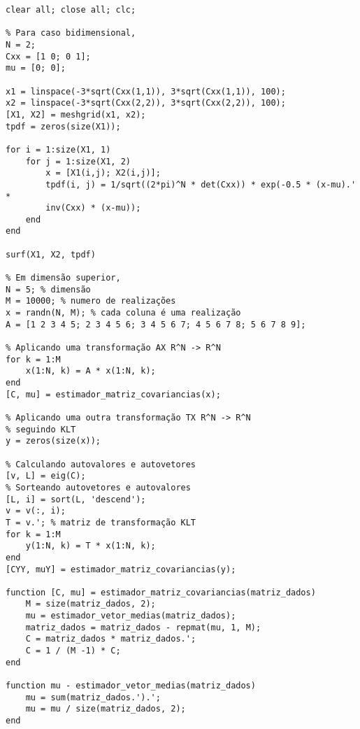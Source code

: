 \documentclass{article}
\begin{document}
\begin{verbatim}
clear all; close all; clc;

% Para caso bidimensional,
N = 2;
Cxx = [1 0; 0 1];
mu = [0; 0];

x1 = linspace(-3*sqrt(Cxx(1,1)), 3*sqrt(Cxx(1,1)), 100);
x2 = linspace(-3*sqrt(Cxx(2,2)), 3*sqrt(Cxx(2,2)), 100);
[X1, X2] = meshgrid(x1, x2);
tpdf = zeros(size(X1));

for i = 1:size(X1, 1)
    for j = 1:size(X1, 2)
        x = [X1(i,j); X2(i,j)];
        tpdf(i, j) = 1/sqrt((2*pi)^N * det(Cxx)) * exp(-0.5 * (x-mu).' *
        inv(Cxx) * (x-mu));
    end
end

surf(X1, X2, tpdf)

% Em dimensão superior,
N = 5; % dimensão
M = 10000; % numero de realizações
x = randn(N, M); % cada coluna é uma realização
A = [1 2 3 4 5; 2 3 4 5 6; 3 4 5 6 7; 4 5 6 7 8; 5 6 7 8 9];

% Aplicando uma transformação AX R^N -> R^N
for k = 1:M
    x(1:N, k) = A * x(1:N, k);
end
[C, mu] = estimador_matriz_covariancias(x);

% Aplicando uma outra transformação TX R^N -> R^N
% seguindo KLT
y = zeros(size(x));

% Calculando autovalores e autovetores
[v, L] = eig(C);
% Sorteando autovetores e autovalores
[L, i] = sort(L, 'descend');
v = v(:, i);
T = v.'; % matriz de transformação KLT
for k = 1:M
    y(1:N, k) = T * x(1:N, k);
end
[CYY, muY] = estimador_matriz_covariancias(y);

function [C, mu] = estimador_matriz_covariancias(matriz_dados)
    M = size(matriz_dados, 2);
    mu = estimador_vetor_medias(matriz_dados);
    matriz_dados = matriz_dados - repmat(mu, 1, M);
    C = matriz_dados * matriz_dados.';
    C = 1 / (M -1) * C;
end

function mu - estimador_vetor_medias(matriz_dados)
    mu = sum(matriz_dados.').';
    mu = mu / size(matriz_dados, 2);
end

\end{verbatim}
\end{document}
